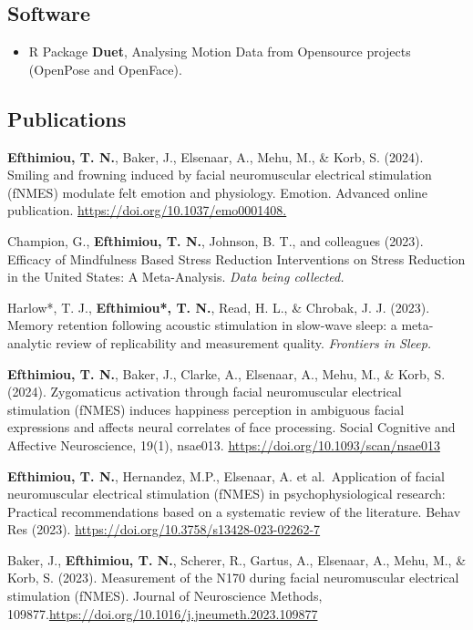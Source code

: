 \documentclass[
  letterpaper,
  DIV=11,
  numbers=noendperiod]{scrartcl}
\providecommand{\tightlist}{%
  \setlength{\itemsep}{0pt}\setlength{\parskip}{0pt}}\usepackage{longtable,booktabs,array}
\begin{document}
\subsection{\texorpdfstring{ Software}{ Software}}\label{software}

\begin{itemize}
\tightlist
\item
  { R Package} \textbf{Duet}, Analysing Motion Data from Opensource
  projects (OpenPose and OpenFace).
\end{itemize}

\subsection{\texorpdfstring{
Publications}{ Publications}}\label{publications}

\textbf{Efthimiou, T. N.}, Baker, J., Elsenaar, A., Mehu, M., \& Korb, S.
(2024). Smiling and frowning induced by facial neuromuscular electrical
stimulation (fNMES) modulate felt emotion and physiology. Emotion.
Advanced online publication. \url{https://doi.org/10.1037/emo0001408.}

Champion, G., \textbf{Efthimiou, T. N.}, Johnson, B. T., and colleagues
(2023). Efficacy of Mindfulness Based Stress Reduction Interventions on
Stress Reduction in the United States: A Meta-Analysis. \emph{Data being
collected.}

Harlow*, T. J., \textbf{Efthimiou*, T. N.}, Read, H. L., \& Chrobak, J. J.
(2023). Memory retention following acoustic stimulation in slow-wave
sleep: a meta-analytic review of replicability and measurement quality.
\emph{Frontiers in Sleep.}

\textbf{Efthimiou, T. N.}, Baker, J., Clarke, A., Elsenaar, A., Mehu, M., \&
Korb, S. (2024). Zygomaticus activation through facial neuromuscular
electrical stimulation (fNMES) induces happiness perception in ambiguous
facial expressions and affects neural correlates of face processing.
Social Cognitive and Affective Neuroscience, 19(1), nsae013.
\url{https://doi.org/10.1093/scan/nsae013}

\textbf{Efthimiou, T. N.}, Hernandez, M.P., Elsenaar, A. et al.~Application of
facial neuromuscular electrical stimulation (fNMES) in
psychophysiological research: Practical recommendations based on a
systematic review of the literature. Behav Res (2023).
\url{https://doi.org/10.3758/s13428-023-02262-7}

Baker, J., \textbf{Efthimiou, T. N.}, Scherer, R., Gartus, A., Elsenaar, A., Mehu,
M., \& Korb, S. (2023). Measurement of the N170 during facial
neuromuscular electrical stimulation (fNMES). Journal of Neuroscience
Methods, 109877.\url{https://doi.org/10.1016/j.jneumeth.2023.109877}
\end{document}
